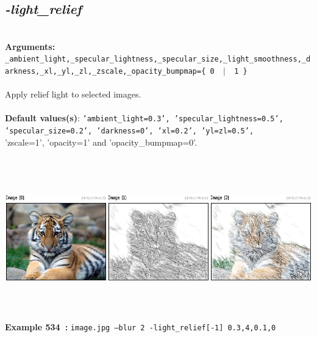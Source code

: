 \documentclass[a4paper,11pt,twoside]{book}
\begin{document}
\subsection{\emph{-light\_relief} }\vspace*{-0.5em}
~\\\textbf{Arguments: } 
{\small \texttt{\_ambient\_light,\_specular\_lightness,\_specular\_size,\_light\_smoothness,\_darkness,\_xl,\_yl,\_zl,\_zscale,\_opacity\_bumpmap=\{ 0 ~$|$~ 1 \}}}\\~\\
Apply relief light to selected images.
~\\~\\\textbf{Default values(s)}: {\small \texttt{'ambient\_light=0.3', 'specular\_lightness=0.5', 'specular\_size=0.2', 'darkness=0', 'xl=0.2', 'yl=zl=0.5',}}
~\\'zscale=1', 'opacity=1' and 'opacity\_bumpmap=0'.
\begin{center}\includegraphics[keepaspectratio=true,height=7cm,width=\textwidth]{img/gmic_def534.jpg}\\
{\footnotesize \textbf{Example 534~:} \texttt{image.jpg --blur 2 -light\_relief[-1] 0.3,4,0.1,0}}
\end{center}
\end{document}

